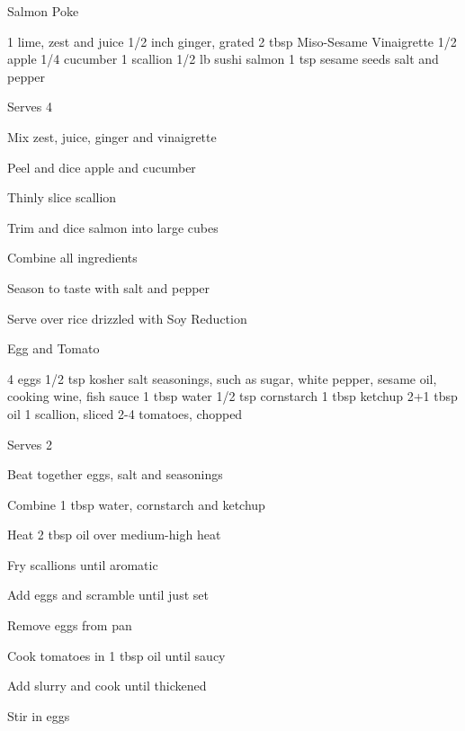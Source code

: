 
\begin{recipe}{Salmon Poke}{}
\begin{ingredients}
1 lime, zest and juice
1/2 inch ginger, grated
2 tbsp Miso-Sesame Vinaigrette
1/2 apple
1/4 cucumber
1 scallion
1/2 lb sushi salmon
1 tsp sesame seeds
salt and pepper
\end{ingredients}
\nextcolumn
Serves 4
\begin{steps}
    \item Mix zest, juice, ginger and vinaigrette
    \item Peel and dice apple and cucumber
    \item Thinly slice scallion
    \item Trim and dice salmon into large cubes
    \item Combine all ingredients
    \item Season to taste with salt and pepper
\end{steps}
Serve over rice drizzled with Soy Reduction
\end{recipe}

\begin{denserecipe}{Egg and Tomato}{}
\begin{ingredients}
4 eggs
1/2 tsp kosher salt
seasonings, such as sugar, white pepper, sesame oil, cooking wine, fish sauce
1 tbsp water
1/2 tsp cornstarch
1 tbsp ketchup
2+1 tbsp oil
1 scallion, sliced
2-4 tomatoes, chopped
\end{ingredients}
\nextcolumn
Serves 2
\begin{steps}
    \item Beat together eggs, salt and seasonings
    \item Combine 1 tbsp water, cornstarch and ketchup
    \item Heat 2 tbsp oil over medium-high heat
    \item Fry scallions until aromatic
    \item Add eggs and scramble until just set
    \item Remove eggs from pan
    \item Cook tomatoes in 1 tbsp oil until saucy
    \item Add slurry and cook until thickened
    \item Stir in eggs
\end{steps}
\end{denserecipe}

